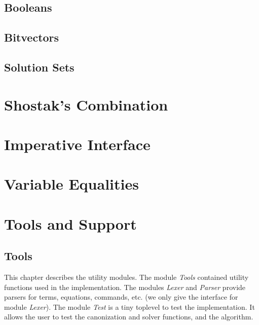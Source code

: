 \documentclass[12pt]{article}
\begin{document}
 \subsection{Booleans}
  
  

 \subsection{Bitvectors}
  
  

 \subsection{Solution Sets}
  
  

\section{Shostak's Combination}
    
   
    
   

\section{Imperative Interface}
    
   
    
  

\section{Variable Equalities}
    
   
    
   


\section{Tools and Support}\label{sec:misc}

  \subsection{Tools}\label{subsec:tools}

  This chapter describes the utility modules. The module \textit{Tools}
  contained utility functions used in the implementation. The modules
  \textit{Lexer} and \textit{Parser} provide parsers for terms,
  equations, commands, etc. (we only give the interface for module
  \textit{Lexer}). The module \textit{Test} is a tiny toplevel
  to test the implementation. It allows the user to test the
  canonization and solver functions, and the algorithm.
\end{document}
